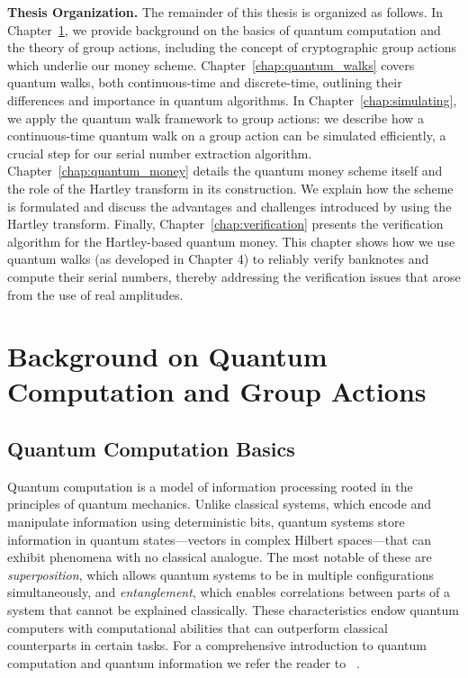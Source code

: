 \documentclass[12pt]{report}
\begin{document}
\medskip\noindent\textbf{Thesis Organization.} 
The remainder of this thesis is organized as follows. In Chapter~\ref{chap:backgound}, we provide background on the basics of quantum computation and the theory of group actions, including the concept of cryptographic group actions which underlie our money scheme. Chapter~\ref{chap:quantum_walks} covers quantum walks, both continuous-time and discrete-time, outlining their differences and importance in quantum algorithms. In Chapter~\ref{chap:simulating}, we apply the quantum walk framework to group actions: we describe how a continuous-time quantum walk on a group action can be simulated efficiently, a crucial step for our serial number extraction algorithm. Chapter~\ref{chap:quantum_money} details the quantum money scheme itself and the role of the Hartley transform in its construction. We explain how the scheme is formulated and discuss the advantages and challenges introduced by using the Hartley transform. Finally, Chapter~\ref{chap:verification} presents the verification algorithm for the Hartley-based quantum money. This chapter shows how we use quantum walks (as developed in Chapter 4) to reliably verify banknotes and compute their serial numbers, thereby addressing the verification issues that arose from the use of real amplitudes.
\vspace{1em}



\chapter{Background on Quantum Computation and Group Actions}\label{chap:backgound}



\section{Quantum Computation Basics}


Quantum computation is a model of information processing rooted in the principles of quantum mechanics. Unlike classical systems, which encode and manipulate information using deterministic bits, quantum systems store information in quantum states—vectors in complex Hilbert spaces—that can exhibit phenomena with no classical analogue. The most notable of these are \emph{superposition}, which allows quantum systems to be in multiple configurations simultaneously, and \emph{entanglement}, which enables correlations between parts of a system that cannot be explained classically. These characteristics endow quantum computers with computational abilities that can outperform classical counterparts in certain tasks. For a comprehensive introduction to quantum computation and quantum information we refer the reader to ~\cite{NielsenChuang2010, watrous2018theory, kaye2006introduction}.
\end{document}

